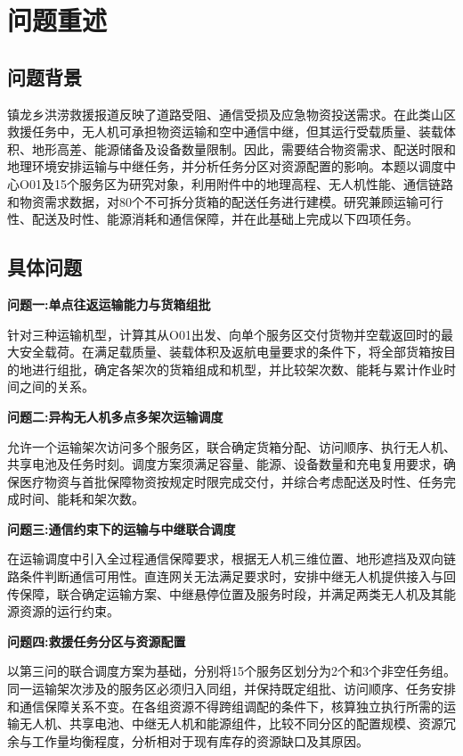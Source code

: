 \documentclass[bwprint]{gmcmthesis}
\begin{document}
\pagestyle{plain}

\maketoc

\clearpage

\section{问题重述}
\subsection{问题背景}
镇龙乡洪涝救援报道反映了道路受阻、通信受损及应急物资投送需求\cite{xinhua2026,daily2026}。在此类山区救援任务中，无人机可承担物资运输和空中通信中继，但其运行受载质量、装载体积、地形高差、能源储备及设备数量限制。因此，需要结合物资需求、配送时限和地理环境安排运输与中继任务，并分析任务分区对资源配置的影响。本题以调度中心O01及15个服务区为研究对象，利用附件中的地理高程、无人机性能、通信链路和物资需求数据，对80个不可拆分货箱的配送任务进行建模。研究兼顾运输可行性、配送及时性、能源消耗和通信保障，并在此基础上完成以下四项任务。
\subsection{具体问题}
\textbf{问题一:单点往返运输能力与货箱组批}

针对三种运输机型，计算其从O01出发、向单个服务区交付货物并空载返回时的最大安全载荷。在满足载质量、装载体积及返航电量要求的条件下，将全部货箱按目的地进行组批，确定各架次的货箱组成和机型，并比较架次数、能耗与累计作业时间之间的关系。

\textbf{问题二:异构无人机多点多架次运输调度}

允许一个运输架次访问多个服务区，联合确定货箱分配、访问顺序、执行无人机、共享电池及任务时刻。调度方案须满足容量、能源、设备数量和充电复用要求，确保医疗物资与首批保障物资按规定时限完成交付，并综合考虑配送及时性、任务完成时间、能耗和架次数。

\textbf{问题三:通信约束下的运输与中继联合调度}

在运输调度中引入全过程通信保障要求，根据无人机三维位置、地形遮挡及双向链路条件判断通信可用性。直连网关无法满足要求时，安排中继无人机提供接入与回传保障，联合确定运输方案、中继悬停位置及服务时段，并满足两类无人机及其能源资源的运行约束。

\textbf{问题四:救援任务分区与资源配置}

以第三问的联合调度方案为基础，分别将15个服务区划分为2个和3个非空任务组。同一运输架次涉及的服务区必须归入同组，并保持既定组批、访问顺序、任务安排和通信保障关系不变。在各组资源不得跨组调配的条件下，核算独立执行所需的运输无人机、共享电池、中继无人机和能源组件，比较不同分区的配置规模、资源冗余与工作量均衡程度，分析相对于现有库存的资源缺口及其原因。
\clearpage
\end{document}

